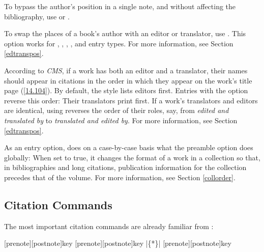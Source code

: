 \documentclass[11pt,letterpaper,oneside]{article}
\begin{document}
\begin{optionlist}
\noindent To bypass the author's position in a single note, and
without affecting the bibliography, use  or
.


\noindent To swap the places of a book's author with an editor or
translator, use . This option works for ,
, , , and
 entry types. For more information, see Section
\ref{edtranspos}.


\noindent According to \textit{CMS}, if a work has both an editor and
a translator, their names should appear in citations in the order in
which they appear on the work's title page (\ref{14.104}). By default,
the style lists editors first. Entries with the option
 reverse this order: Their translators print
first. If a work's translators and editors are identical, using
 reverses the order of their roles, say, from
\textit{edited and translated by} to \textit{translated and edited
by}. For more information, see Section \ref{edtranspos}.


\noindent As an entry option,  does on a case-by-case
basis what the  preamble option does globally: When set
to true, it changes the format of a work in a collection so that, in
bibliographies and long citations, publication information for the
collection precedes that of the volume. For more information, see
Section \ref{collorder}.

\end{optionlist}

\subsection{Citation Commands}
\label{citecmds}

The most important citation commands are already familiar from
\biblatex:

\begin{ltxsyntax}
[prenote][postnote]{key}
[prenote][postnote]{key}
|\{*\}|
[prenote][postnote]{key}
\end{ltxsyntax}
\end{document}
